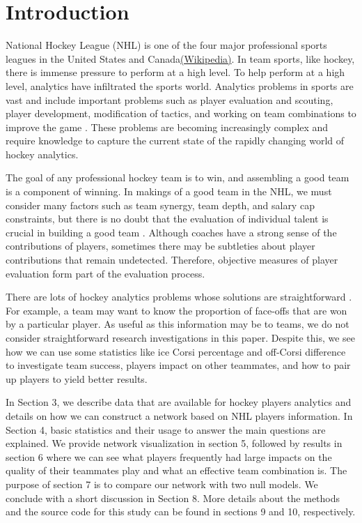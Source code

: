 \documentclass{article}
\begin{document}
\section{Introduction}
National Hockey League (NHL) is one of the four major professional sports leagues in the United States and Canada\href{https://en.wikipedia.org/wiki/Season_structure_of_the_NHL}{(Wikipedia)}. In team sports, like hockey, there is immense pressure to perform at a high level. To help perform at a high level, analytics have infiltrated the sports world. Analytics problems in sports are vast and include important problems such as player evaluation and scouting, player development, modification of tactics, and working on team combinations to improve the game \cite{foster2021playing}. These problems are becoming increasingly complex and require knowledge to capture the current state of the rapidly changing world of hockey analytics.\par
The goal of any professional hockey team is to win, and assembling a good team is a component of winning. In makings of a good team in the NHL, we must consider  many factors such as team synergy, team depth, and salary cap constraints, but there is no doubt that the evaluation of individual talent is crucial in building a good team \cite{guan2022game}. Although coaches have a strong sense of the contributions of players, sometimes there may be subtleties about player contributions that remain undetected. Therefore, objective measures of player evaluation form part of the evaluation process.\par
There are lots of hockey analytics problems whose solutions are straightforward \cite{vollman2016hockey}. For example, a team may want to know the proportion of face-offs that are won by a particular player. As useful as this information may be to teams, we do not consider straightforward research investigations in this paper. Despite this, we see how we can use some statistics like ice Corsi percentage and off-Corsi difference to investigate team success, players\textsc{}  impact on other teammates, and how to pair up players to yield better results. \par
In Section 3, we describe data that are available for hockey players\textsc{} analytics and details on how we can construct a network based on NHL players\textsc{} information. In Section 4, basic statistics and their usage to answer the main questions are explained. We provide network visualization in section 5, followed by results in section 6 where we can see what players frequently had large impacts on the quality of their teammates\textsc{} play and what an effective team combination is. The purpose of section 7 is to compare our network with two null models. We conclude with a short discussion in Section 8. More details about the methods and the source code for this study can be found in sections 9 and 10, respectively.
\end{document}
